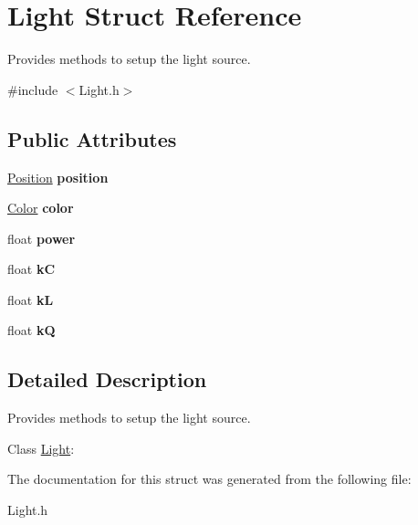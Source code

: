 \hypertarget{struct_light}{\section{Light Struct Reference}
\label{struct_light}
}


Provides methods to setup the light source.  




{\ttfamily \#include $<$Light.\+h$>$}

\subsection*{Public Attributes}
\begin{DoxyCompactItemize}
\item 
\hypertarget{struct_light_afeb738db41e987719e359166ef93314f}{\hyperlink{struct_position}{Position} {\bfseries position}}\label{struct_light_afeb738db41e987719e359166ef93314f}

\item 
\hypertarget{struct_light_ad7a168d26aed1bf7cca1a8d8e6f8ada4}{\hyperlink{struct_color}{Color} {\bfseries color}}\label{struct_light_ad7a168d26aed1bf7cca1a8d8e6f8ada4}

\item 
\hypertarget{struct_light_a6c4c401141c4cdb3b9b9b3bab7dd6fbb}{float {\bfseries power}}\label{struct_light_a6c4c401141c4cdb3b9b9b3bab7dd6fbb}

\item 
\hypertarget{struct_light_a888f11000d2baf1228d9e5c8d8c90fcb}{float {\bfseries k\+C}}\label{struct_light_a888f11000d2baf1228d9e5c8d8c90fcb}

\item 
\hypertarget{struct_light_ab3918c449fb40fa5c6cc5283f2c9687d}{float {\bfseries k\+L}}\label{struct_light_ab3918c449fb40fa5c6cc5283f2c9687d}

\item 
\hypertarget{struct_light_a79c8e47de58f131ff5403fc2d823cc21}{float {\bfseries k\+Q}}\label{struct_light_a79c8e47de58f131ff5403fc2d823cc21}

\end{DoxyCompactItemize}


\subsection{Detailed Description}
Provides methods to setup the light source. 

Class \hyperlink{struct_light}{Light}\+: 

The documentation for this struct was generated from the following file\+:\begin{DoxyCompactItemize}
\item 
Light.\+h\end{DoxyCompactItemize}
